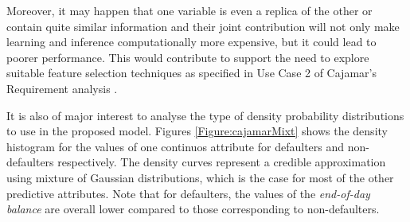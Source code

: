 %


%
%



Moreover, it may happen that one variable is even a replica of the other or contain quite similar information
and their joint contribution will not only make learning and inference computationally more expensive, but it could lead to poorer performance. This would contribute to support the need to explore suitable feature selection techniques as specified in Use Case 2 of Cajamar's Requirement analysis\cite{Fer14b} .



It is also of major interest to analyse the type of density probability distributions to use in the proposed model. Figures \ref{Figure:cajamarMixt} shows the density histogram for the values of one continuos attribute for defaulters and non-defaulters respectively. The density curves represent a credible approximation using mixture of Gaussian distributions, which is the case for most of the other predictive attributes. Note that for defaulters, the values of the \emph{end-of-day balance} are overall lower compared to those corresponding to non-defaulters.

